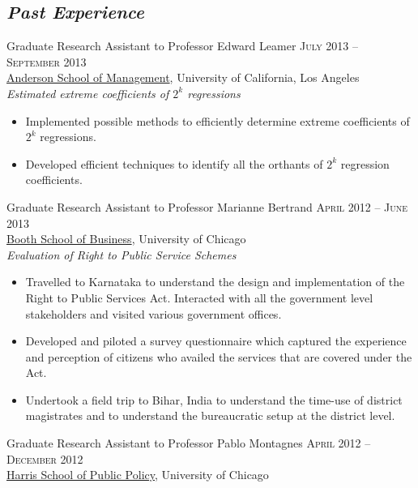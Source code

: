 \documentclass[11pt]{article}
\begin{document}
\subsection{\textbf{\emph{Past Experience}}}
\label{sec-2-2}
\flushleft
Graduate Research Assistant to Professor Edward Leamer \hfill
\textsc{\normalsize July 2013 -- September 2013}\\
\href{http://www.anderson.ucla.edu/faculty/global-economics-and-management/phd-program}{Anderson School of Management}, University of California, Los Angeles \\
\emph{Estimated extreme coefficients of $2^k$ regressions}
\begin{itemize}
\item Implemented possible methods to efficiently determine extreme coefficients of $2^k$ regressions.
\item Developed efficient techniques to identify all the orthants of $2^k$ regression coefficients.
\end{itemize}
\vspace{0.5em}
Graduate Research Assistant to Professor Marianne Bertrand \hfill
\textsc{\normalsize April 2012 -- June 2013}\\
\href{http://www.chicagobooth.edu/faculty/bio.aspx?person_id\%3D12824551424}{Booth School of Business}, University of Chicago \\
\emph{Evaluation of Right to Public Service Schemes}
\begin{itemize}
\item Travelled to Karnataka to understand the design and implementation of the Right to Public Services Act. Interacted with all the government level stakeholders and visited various government offices.
\item Developed and piloted a survey questionnaire which captured the experience and perception of citizens who availed the services that are covered under the Act.
\item Undertook a field trip to Bihar, India to understand the time-use of district magistrates and to understand the bureaucratic setup at the district level.
\end{itemize}
\vspace{0.5em}
\pagebreak
Graduate Research Assistant to Professor Pablo Montagnes \hfill
\textsc{April 2012 -- December 2012}\\
\href{http://harrisschool.uchicago.edu/directory/faculty/b-pablo_montagnes}{Harris School of Public Policy}, University of Chicago \\
\end{document}
